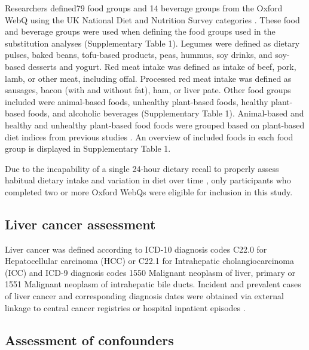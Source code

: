 \documentclass[sn-basic,Numbered,pdflatex]{sn-jnl}
\begin{document}
Researchers defined79 food groups and 14 beverage groups from the Oxford
WebQ using the UK National Diet and Nutrition Survey categories
\citep{piernas2021}. These food and beverage groups were used when defining
the food groups used in the substitution analyses (Supplementary Table
1). Legumes were defined as dietary pulses, baked beans, tofu-based
products, peas, hummus, soy drinks, and soy-based desserts and yogurt.
Red meat intake was defined as intake of beef, pork, lamb, or other
meat, including offal. Processed red meat intake was defined as
sausages, bacon (with and without fat), ham, or liver pate. Other food
groups included were animal-based foods, unhealthy plant-based foods,
healthy plant-based foods, and alcoholic beverages (Supplementary Table
1). Animal-based and healthy and unhealthy plant-based food foods were
grouped based on plant-based diet indices from previous studies
\citep{Thompson2023, Heianza2021, Satija2017, Satija2016}. An overview of
included foods in each food group is displayed in Supplementary Table 1.

Due to the incapability of a single 24-hour dietary recall to properly
assess habitual dietary intake and variation in diet over time
\citep{thompson2013, gurinovic2017}, only participants who completed two or
more Oxford WebQs were eligible for inclusion in this study.

\hypertarget{subsec3}{%
\subsection{Liver cancer assessment}\label{subsec3}}

Liver cancer was defined according to ICD-10 diagnosis codes C22.0 for
Hepatocellular carcinoma (HCC) or C22.1 for Intrahepatic
cholangiocarcinoma (ICC) and ICD-9 diagnosis codes 1550 Malignant
neoplasm of liver, primary or 1551 Malignant neoplasm of intrahepatic
bile ducts. Incident and prevalent cases of liver cancer and
corresponding diagnosis dates were obtained via external linkage to
central cancer registries or hospital inpatient episodes \citep{RN112, RN114}.

\hypertarget{subsec4}{%
\subsection{Assessment of confounders}\label{subsec4}}
\end{document}
